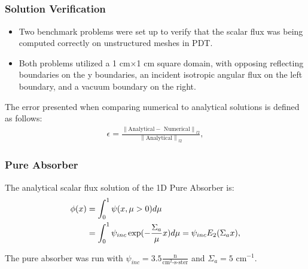 \documentclass[]{beamer}
\newcommand{\norm}[1]{\left\lVert#1\right\rVert}
\begin{document}
\subsection{}
\begin{frame}[t]\frametitle{Solution Verification}
\begin{block}{}
\begin{itemize}
\item Two benchmark problems were set up to verify that the scalar flux was being computed correctly on unstructured meshes in PDT.
\item Both problems utilized a 1 cm$\times$1 cm square domain, with opposing reflecting boundaries on the y boundaries, an incident isotropic angular flux on the left boundary, and a vacuum boundary on the right.
\end{itemize}
\end{block}
\begin{block}{}
The error presented when comparing numerical to analytical solutions is defined as follows:
\begin{align*}
\epsilon = \frac{\norm{\text{Analytical} - \text{ Numerical}}_{l2}}{\norm{\text{Analytical}}_{l2}},
\end{align*}
\end{block}
\end{frame}

\begin{frame}[t]\frametitle{Pure Absorber}
\begin{block}{}
The analytical scalar flux solution of the 1D Pure Absorber is:
\begin{align*}
\phi(x) &= \int_{0}^{1}\psi(x,\mu>0) d\mu \notag \\
&= \int_{0}^{1}\psi_{inc}\exp(-\frac{\Sigma_a}{\mu} x) d\mu = \psi_{inc} E_{2}(\Sigma_a x),
\end{align*}
\end{block}
\begin{block}{}
The pure absorber was run with $\psi_{inc} = 3.5 \frac{\text{n}}{\text{cm}^2\text{-s-ster}}$ and $\Sigma_a = 5 \text{ cm}^{-1}$.
\end{block}
\end{frame}
\end{document}
